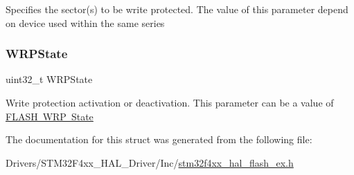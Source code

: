 Specifies the sector(s) to be write protected. The value of this parameter depend on device used within the same series \mbox{\label{struct_f_l_a_s_h___o_b_program_init_type_def_ab5ab320199482e9eb21dc8460501dea5}} 
\subsubsection{\texorpdfstring{W\+R\+P\+State}{WRPState}}
{\footnotesize\ttfamily uint32\+\_\+t W\+R\+P\+State}

Write protection activation or deactivation. This parameter can be a value of \mbox{\hyperlink{group___f_l_a_s_h_ex___w_r_p___state}{F\+L\+A\+SH W\+RP State}} 

The documentation for this struct was generated from the following file\+:\begin{DoxyCompactItemize}
\item 
Drivers/\+S\+T\+M32\+F4xx\+\_\+\+H\+A\+L\+\_\+\+Driver/\+Inc/\mbox{\hyperlink{stm32f4xx__hal__flash__ex_8h}{stm32f4xx\+\_\+hal\+\_\+flash\+\_\+ex.\+h}}\end{DoxyCompactItemize}
